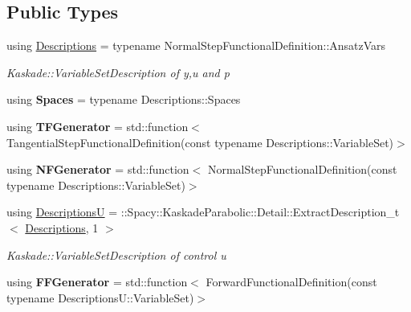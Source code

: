 \subsection*{Public Types}
\begin{DoxyCompactItemize}
\item 
\hypertarget{group__KaskadeParabolicGroup_gab8c662bd21758959d061a447fb8d12b7}{using \hyperlink{group__KaskadeParabolicGroup_gab8c662bd21758959d061a447fb8d12b7}{Descriptions} = typename Normal\-Step\-Functional\-Definition\-::\-Ansatz\-Vars}\label{group__KaskadeParabolicGroup_gab8c662bd21758959d061a447fb8d12b7}

\begin{DoxyCompactList}\small\item\em Kaskade\-::\-Variable\-Set\-Description of y,u and p \end{DoxyCompactList}\item 
\hypertarget{group__KaskadeParabolicGroup_ga8a6dce9eedafe41b5af13469a559bc9f}{using {\bfseries Spaces} = typename Descriptions\-::\-Spaces}\label{group__KaskadeParabolicGroup_ga8a6dce9eedafe41b5af13469a559bc9f}

\item 
\hypertarget{group__KaskadeParabolicGroup_ga519b63b936eff2a895d9160ac95f3348}{using {\bfseries T\-F\-Generator} = std\-::function$<$ Tangential\-Step\-Functional\-Definition(const typename Descriptions\-::\-Variable\-Set)$>$}\label{group__KaskadeParabolicGroup_ga519b63b936eff2a895d9160ac95f3348}

\item 
\hypertarget{group__KaskadeParabolicGroup_gaed4e57800f1a773e33b8073e8991975d}{using {\bfseries N\-F\-Generator} = std\-::function$<$ Normal\-Step\-Functional\-Definition(const typename Descriptions\-::\-Variable\-Set)$>$}\label{group__KaskadeParabolicGroup_gaed4e57800f1a773e33b8073e8991975d}

\item 
\hypertarget{group__KaskadeParabolicGroup_ga040dd0e071b5500d2c4a49be5147cdc3}{using \hyperlink{group__KaskadeParabolicGroup_ga040dd0e071b5500d2c4a49be5147cdc3}{Descriptions\-U} = \-::Spacy\-::\-Kaskade\-Parabolic\-::\-Detail\-::\-Extract\-Description\-\_\-t$<$ \hyperlink{group__KaskadeParabolicGroup_gab8c662bd21758959d061a447fb8d12b7}{Descriptions}, 1 $>$}\label{group__KaskadeParabolicGroup_ga040dd0e071b5500d2c4a49be5147cdc3}

\begin{DoxyCompactList}\small\item\em Kaskade\-::\-Variable\-Set\-Description of control u \end{DoxyCompactList}\item 
\hypertarget{group__KaskadeParabolicGroup_ga15c2ea1e40830aa86fe931710ec1c050}{using {\bfseries F\-F\-Generator} = std\-::function$<$ Forward\-Functional\-Definition(const typename Descriptions\-U\-::\-Variable\-Set)$>$}\label{group__KaskadeParabolicGroup_ga15c2ea1e40830aa86fe931710ec1c050}


\end{DoxyCompactItemize}

